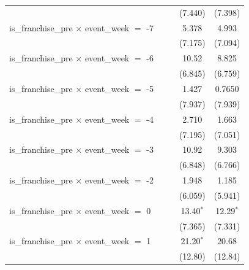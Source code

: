 \begin{tabular}{lcccc}
                                                           &                &               & (7.440)      & (7.398)\\   
   is\_franchise\_pre $\times$ event\_week $=$ -7          &                &               & 5.378        & 4.993\\   
                                                           &                &               & (7.175)      & (7.094)\\   
   is\_franchise\_pre $\times$ event\_week $=$ -6          &                &               & 10.52        & 8.825\\   
                                                           &                &               & (6.845)      & (6.759)\\   
   is\_franchise\_pre $\times$ event\_week $=$ -5          &                &               & 1.427        & 0.7650\\   
                                                           &                &               & (7.937)      & (7.939)\\   
   is\_franchise\_pre $\times$ event\_week $=$ -4          &                &               & 2.710        & 1.663\\   
                                                           &                &               & (7.195)      & (7.051)\\   
   is\_franchise\_pre $\times$ event\_week $=$ -3          &                &               & 10.92        & 9.303\\   
                                                           &                &               & (6.848)      & (6.766)\\   
   is\_franchise\_pre $\times$ event\_week $=$ -2          &                &               & 1.948        & 1.185\\   
                                                           &                &               & (6.059)      & (5.941)\\   
   is\_franchise\_pre $\times$ event\_week $=$ 0           &                &               & 13.40$^{*}$  & 12.29$^{*}$\\   
                                                           &                &               & (7.365)      & (7.331)\\   
   is\_franchise\_pre $\times$ event\_week $=$ 1           &                &               & 21.20$^{*}$  & 20.68\\   
                                                           &                &               & (12.80)      & (12.84)\\   

\end{tabular}

